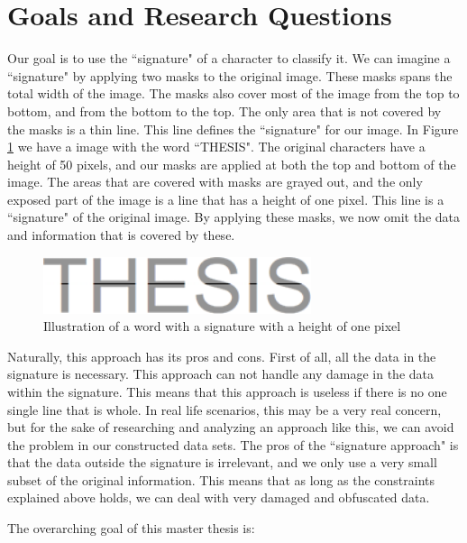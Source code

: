 
\section{Goals and Research Questions}
\label{sec:goals_and_research_questions}
Our goal is to use the ``signature" of a character to classify it. We can imagine a ``signature" by applying two masks to the original image. These masks spans the total width of the image. The masks also cover most of the image from the top to bottom, and from the bottom to the top. The only area that is not covered by the masks is a thin line. This line defines the ``signature" for our image. In Figure \ref{fig:thesis-signature} we have a image with the word ``THESIS". The original characters have a height of 50 pixels, and our masks are applied at both the top and bottom of the image. The areas that are covered with masks are grayed out, and the only exposed part of the image is a line that has a height of one pixel. This line is a ``signature" of the original image. By applying these masks, we now omit the data and information that is covered by these.

\begin{figure}[ht]
    \centering
    \includegraphics[width=0.7\textwidth]{fig/chapter1/signature.png}
    \caption{Illustration of a word with a signature with a height of one pixel}
    \label{fig:thesis-signature}
\end{figure}

Naturally, this approach has its pros and cons. First of all, all the data in the signature is necessary. This approach can not handle any damage in the data within the signature. This means that this approach is useless if there is no one single line that is whole. In real life scenarios, this may be a very real concern, but for the sake of researching and analyzing an approach like this, we can avoid the problem in our constructed data sets. The pros of the ``signature approach" is that the data outside the signature is irrelevant, and we only use a very small subset of the original information. This means that as long as the constraints explained above holds, we can deal with very damaged and obfuscated data.

The overarching goal of this master thesis is:

